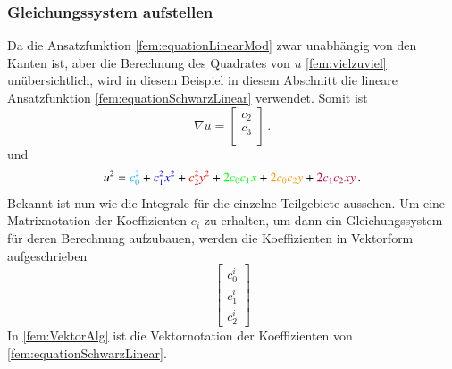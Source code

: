 \subsubsection{Gleichungssystem aufstellen 
\label{fem:section:GL}}

Da die Ansatzfunktion \eqref{fem:equationLinearMod} zwar unabhängig von den Kanten ist, aber die Berechnung des Quadrates von $u$ \eqref{fem:vielzuviel} unübersichtlich, wird in diesem Beispiel in diesem Abschnitt die lineare Ansatzfunktion \eqref{fem:equationSchwarzLinear} verwendet. Somit ist
\begin{equation}
	\nabla u = 	
	\left[ \begin{array}{r}
	c_2 \\
	c_3 \\
	\end{array}\right] \, .
	\label{fem:equationSchwarzquadratischPP}
\end{equation}  
und 
\begin{equation}
 	u^2 = \textcolor{cyan}{c_0^2} + \textcolor{blue}{c_1^2 x^2} + \textcolor{red}{c_2^2 y^2} + \textcolor{green}{2 c_0 c_1 x} + \textcolor{orange}{2 c_0 c_2 y} +\textcolor{purple}{ 2 c_1 c_2 xy} \, .
	\label{fem:equationSchwarzquadratischQQQ}
\end{equation}  
Bekannt ist nun wie die Integrale für die einzelne Teilgebiete aussehen. Um eine Matrixnotation der Koeffizienten $c_i$ zu erhalten, um dann ein Gleichungssystem für deren Berechnung aufzubauen, werden die Koeffizienten in Vektorform aufgeschrieben
\begin{equation}
	\begin{bmatrix}
	c_0^i  \\
	c_1^i \\
	c_2^i
	\end{bmatrix}
	\label{fem:VektorAlg}
\end{equation}
In \eqref{fem:VektorAlg} ist die Vektornotation der Koeffizienten von \eqref{fem:equationSchwarzLinear}.

